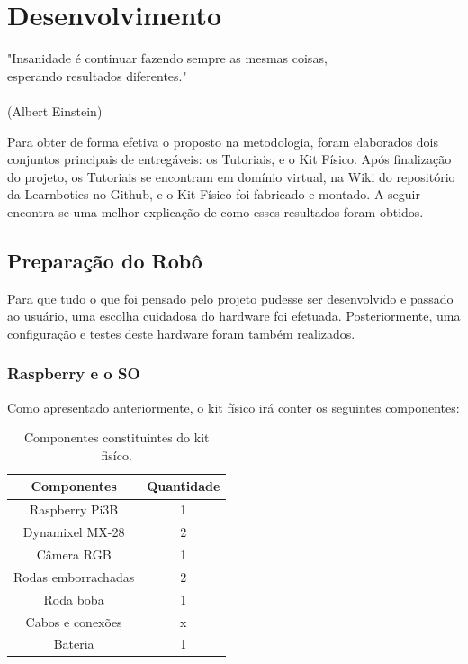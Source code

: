 \chapter{Desenvolvimento}
\label{chap:desen_test}
\begin{flushright}
	"Insanidade é continuar fazendo sempre as mesmas coisas, \\ 
	esperando resultados diferentes." \\
	\ \\
	(Albert Einstein)
\end{flushright}

Para obter de forma efetiva o proposto na metodologia, foram elaborados dois conjuntos principais de entregáveis: os Tutoriais, e o Kit Físico. Após finalização do projeto, os Tutoriais se encontram em domínio virtual, na Wiki do repositório da Learnbotics no Github, e o Kit Físico foi fabricado e montado. A seguir encontra-se uma melhor explicação de como esses resultados foram obtidos.

\section{Preparação do Robô}
Para que tudo o que foi pensado pelo projeto pudesse ser desenvolvido e passado ao usuário, uma escolha cuidadosa do hardware foi efetuada. Posteriormente, uma configuração e testes deste hardware foram também realizados.

\subsection{Raspberry e o SO}

Como apresentado anteriormente, o kit físico irá conter os seguintes componentes:
\begin{table}
	\centering
	\begin{small}
		\caption{Componentes constituintes do kit fisíco.} \label{Tabela1}
		\begin{tabular}{cc}
			\hline
			Componentes              & Quantidade\\
			\hline
			Raspberry Pi3B              & 1 \\
			Dynamixel MX-28			    & 2 \\
			Câmera RGB		            & 1 \\
			Rodas emborrachadas		    & 2 \\
			Roda boba		            & 1 \\
			Cabos e conexões            & x \\
			Bateria 			        & 1 \\
			\hline
		\end{tabular}
	\end{small}
\end{table}

